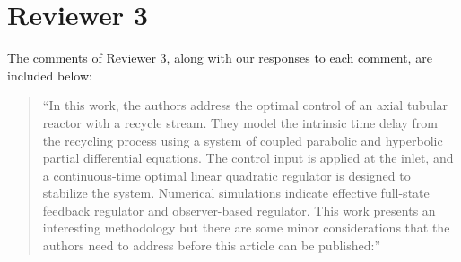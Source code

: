 \documentclass[11pt,answers]{exam}
\begin{document}
\newpage
\section*{Reviewer 3}

The comments of Reviewer 3, along with our responses to each comment, are included below:

\begin{quote}
    ``In this work, the authors address the optimal control of an axial tubular reactor with a recycle stream. They model the intrinsic time delay from the recycling process using a system of coupled parabolic and hyperbolic partial differential equations. The control input is applied at the inlet, and a continuous-time optimal linear quadratic regulator is designed to stabilize the system. Numerical simulations indicate effective full-state feedback regulator and observer-based regulator. This work presents an interesting methodology but there are some minor considerations that the authors need to address before this article can be published:''
\end{quote}
\end{document}

